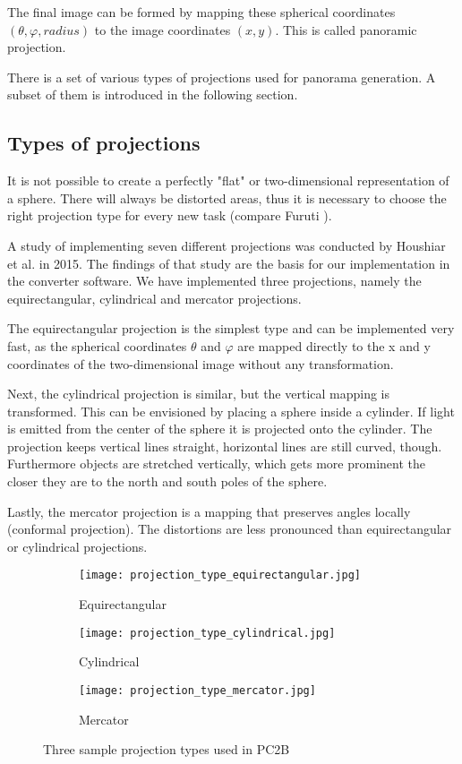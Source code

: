 The final image can be formed by mapping these spherical coordinates {$(\theta, \varphi, radius)$} to the image coordinates {$(x, y)$}. This is called panoramic projection.

There is a set of various types of projections used for panorama generation. A subset of them is introduced in the following section.

\subsection{Types of projections} \label{section_types_of_projections}

It is not possible to create a perfectly "flat" or two-dimensional representation of a sphere. There will always be distorted areas, thus it is necessary to choose the right projection type for every new task (compare Furuti \parencite{panoramaProblem} ).

A study of implementing seven different projections was conducted by Houshiar et al. \parencite{houshiar2015a} in 2015. The findings of that study are the basis for our implementation in the converter software. We have implemented three projections, namely the equirectangular, cylindrical and mercator projections.

The equirectangular projection is the simplest type and can be implemented very fast, as the spherical coordinates {$\theta$} and {$\varphi$} are mapped directly to the x and y coordinates of the two-dimensional image without any transformation.

Next, the cylindrical projection is similar, but the vertical mapping is transformed. This can be envisioned by placing a sphere inside a cylinder. If light is emitted from the center of the sphere it is projected onto the cylinder. The projection keeps vertical lines straight, horizontal lines are still curved, though. Furthermore objects are stretched vertically, which gets more prominent the closer they are to the north and south poles of the sphere.

Lastly, the mercator projection is a mapping that preserves angles locally (conformal projection). The distortions are less pronounced than equirectangular or cylindrical projections.

\begin{figure}[h]
	\centering
	\begin{subfigure}[b]{0.3\textwidth}
		\centering
		\texttt{[image: projection\_type\_equirectangular.jpg]}
		\caption{Equirectangular}
		\label{fig:equirectangular}
	\end{subfigure}
	\hfill
	\begin{subfigure}[b]{0.3\textwidth}
		\centering
		\texttt{[image: projection\_type\_cylindrical.jpg]}
		\caption{Cylindrical}
		\label{fig:cylindrical}
	\end{subfigure}
	\hfill
	\begin{subfigure}[b]{0.3\textwidth}
		\centering
		\texttt{[image: projection\_type\_mercator.jpg]}
		\caption{Mercator}
		\label{fig:mercator}
	\end{subfigure}
	\caption{Three sample projection types used in PC2B}
	\label{fig:three_projections}
\end{figure}

